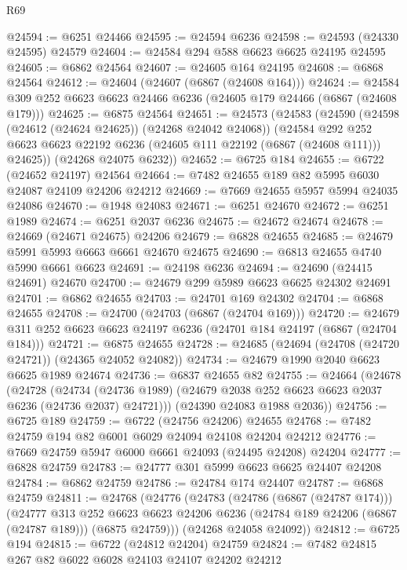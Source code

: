 \begin{lexlean}{R69}
\begin{coremodule}
{@24594 := @6251 @24466
@24595 := @24594 @6236
@24598 := @24593 (@24330 @24595) @24579
@24604 := @24584 @294 @588 @6623 @6625 @24195 @24595
@24605 := @6862 @24564
@24607 := @24605 @164 @24195
@24608 := @6868 @24564
@24612 := @24604 (@24607 (@6867 (@24608 @164)))
@24624 := @24584 @309 @252 @6623 @6623 @24466 @6236 (@24605 @179 @24466 (@6867 (@24608 @179)))
@24625 := @6875 @24564
@24651 := @24573
    (@24583
      (@24590
        (@24598 (@24612 (@24624 @24625)) (@24268 @24042 @24068))
        (@24584
          @292
          @252
          @6623
          @6623
          @22192
          @6236
          (@24605 @111 @22192 (@6867 (@24608 @111)))
          @24625))
      (@24268 @24075 @6232))
@24652 := @6725 @184
@24655 := @6722 (@24652 @24197) @24564
@24664 := @7482 @24655 @189 @82 @5995 @6030 @24087 @24109 @24206 @24212
@24669 := @7669 @24655 @5957 @5994 @24035 @24086
@24670 := @1948 @24083
@24671 := @6251 @24670
@24672 := @6251 @1989
@24674 := @6251 @2037 @6236
@24675 := @24672 @24674
@24678 := @24669 (@24671 @24675) @24206
@24679 := @6828 @24655
@24685 := @24679 @5991 @5993 @6663 @6661 @24670 @24675
@24690 := @6813 @24655 @4740 @5990 @6661 @6623
@24691 := @24198 @6236
@24694 := @24690 (@24415 @24691) @24670
@24700 := @24679 @299 @5989 @6623 @6625 @24302 @24691
@24701 := @6862 @24655
@24703 := @24701 @169 @24302
@24704 := @6868 @24655
@24708 := @24700 (@24703 (@6867 (@24704 @169)))
@24720 := @24679 @311 @252 @6623 @6623 @24197 @6236 (@24701 @184 @24197 (@6867 (@24704 @184)))
@24721 := @6875 @24655
@24728 := @24685 (@24694 (@24708 (@24720 @24721)) (@24365 @24052 @24082))
@24734 := @24679 @1990 @2040 @6623 @6625 @1989 @24674
@24736 := @6837 @24655 @82
@24755 := @24664
    (@24678
      (@24728
        (@24734 (@24736 @1989) (@24679 @2038 @252 @6623 @6623 @2037 @6236 (@24736 @2037) @24721)))
      (@24390 @24083 @1988 @2036))
@24756 := @6725 @189
@24759 := @6722 (@24756 @24206) @24655
@24768 := @7482 @24759 @194 @82 @6001 @6029 @24094 @24108 @24204 @24212
@24776 := @7669 @24759 @5947 @6000 @6661 @24093 (@24495 @24208) @24204
@24777 := @6828 @24759
@24783 := @24777 @301 @5999 @6623 @6625 @24407 @24208
@24784 := @6862 @24759
@24786 := @24784 @174 @24407
@24787 := @6868 @24759
@24811 := @24768
    (@24776
      (@24783
        (@24786 (@6867 (@24787 @174)))
        (@24777
          @313
          @252
          @6623
          @6623
          @24206
          @6236
          (@24784 @189 @24206 (@6867 (@24787 @189)))
          (@6875 @24759)))
      (@24268 @24058 @24092))
@24812 := @6725 @194
@24815 := @6722 (@24812 @24204) @24759
@24824 := @7482 @24815 @267 @82 @6022 @6028 @24103 @24107 @24202 @24212
}
\end{coremodule}
\end{lexlean}
